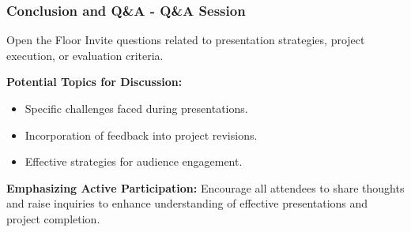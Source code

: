\documentclass{beamer}
\begin{document}
\begin{frame}[fragile]
    \frametitle{Conclusion and Q\&A - Q\&A Session}
    \begin{block}{Open the Floor}
        Invite questions related to presentation strategies, project execution, or evaluation criteria.
    \end{block}
    
    \textbf{Potential Topics for Discussion:}
    \begin{itemize}
        \item Specific challenges faced during presentations.
        \item Incorporation of feedback into project revisions.
        \item Effective strategies for audience engagement.
    \end{itemize}
    
    \textbf{Emphasizing Active Participation:}  
    Encourage all attendees to share thoughts and raise inquiries to enhance understanding of effective presentations and project completion.
\end{frame}
\end{document}
